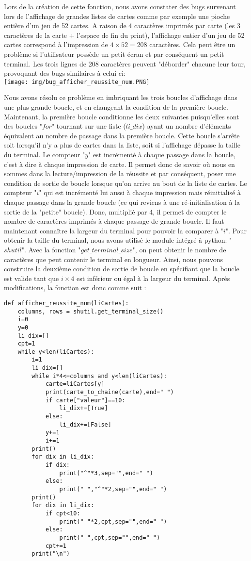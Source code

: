 \documentclass[10pt,a4paper,french,titlepage]{article}
\begin{document}
Lors de la création de cette fonction, nous avons constater des bugs survenant lors de l'affichage de grandes listes de cartes comme par exemple une pioche entière d'un jeu de 52 cartes. A raison de 4 caractères imprimés par carte (les 3 caractères de la carte $+$ l'espace de fin du print), l'affichage entier d'un jeu de 52 cartes correspond à l'impression de $4\times52=208$ caractères. Cela peut être un problème si l'utilisateur possède un petit écran et par conséquent un petit terminal. Les trois lignes de 208 caractères peuvent "déborder" chacune leur tour, provoquant des bugs similaires à  celui-ci:\\
\texttt{[image: img/bug\_afficher\_reussite\_num.PNG]}

Nous avons résolu ce problème en imbriquant les trois boucles d'affichage dans une plus grande boucle, et en changeant la condition de la première boucle. Maintenant, la première boucle conditionne les deux suivantes puisqu'elles sont des boucles "$for$" tournant sur une liste ($li\_dix$) ayant un nombre  d'éléments équivalent au nombre de passage dans la première boucle. Cette boucle s'arrête soit lorsqu'il n'y a plus de cartes dans la liste, soit si l'affichage dépasse la taille du terminal. Le compteur "$y$" est incrémenté à chaque passage dans la boucle, c'est à dire à chaque impression de carte. Il permet donc de savoir où nous en sommes dans la lecture/impression de la réussite et par conséquent, poser une condition de sortie de boucle lorsque qu'on arrive au bout de la liste de cartes. Le compteur "$i$" qui est incrémenté lui aussi à chaque impression mais réinitialisé à chaque passage dans la grande  boucle (ce qui reviens à une ré-initialisation à la sortie de la "petite" boucle). Donc, multiplié par 4, il permet de compter le nombre de caractères imprimés à chaque passage de grande boucle. Il faut maintenant connaître la largeur du terminal pour pouvoir la comparer à "$i$". Pour obtenir la taille du terminal, nous avons utilisé le module intégré à python: "$shutil$". Avec la fonction "$get\_terminal\_size$", on peut obtenir le nombre de caractères que peut  contenir le terminal en longueur. Ainsi, nous pouvons construire la deuxième condition de sortie de boucle en spécifiant que la boucle est valide tant que $i \times 4$ est inférieur ou égal à la largeur du terminal. Après modifications, la fonction est donc comme suit :
\begin{lstlisting}
def afficher_reussite_num(liCartes):
    columns, rows = shutil.get_terminal_size()
    i=0
    y=0
    li_dix=[]
    cpt=1
    while y<len(liCartes):
        i=1
        li_dix=[]
        while i*4<=columns and y<len(liCartes): 
            carte=liCartes[y]
            print(carte_to_chaine(carte),end=" ")
            if carte["valeur"]==10:
                li_dix+=[True]
            else:
                li_dix+=[False]
            y+=1
            i+=1
        print()
        for dix in li_dix:
            if dix:
                print("^"*3,sep="",end=" ")
            else:
                print(" ","^"*2,sep="",end=" ")
        print()
        for dix in li_dix:
            if cpt<10:
                print(" "*2,cpt,sep="",end=" ")
            else:
                print(" ",cpt,sep="",end=" ")
            cpt+=1
        print("\n")
\end{lstlisting}
\end{document}
